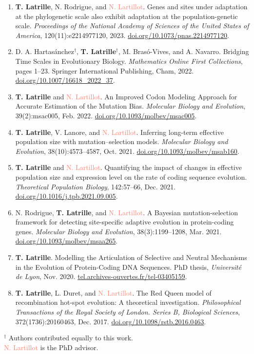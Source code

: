 \documentclass[11pt,a4paper]{moderncv}
\begin{document}
\begin{enumerate}
    \item \textbf{T. Latrille}, N. Rodrigue, and \textcolor{Salmon}{N. Lartillot}. Genes and sites under adaptation at the phylogenetic scale also exhibit adaptation at the population-genetic scale. \textit{Proceedings of the National Academy of Sciences of the United States of America}, 120(11):e2214977120, 2023. \href{https://doi.org/10.1073/pnas.2214977120}{doi.org/10.1073/pnas.2214977120}.
    \item D. A. Hartasánchez$^{\dag}$, \textbf{T. Latrille}$^{\dag}$, M. Brasó-Vives, and A. Navarro. Bridging Time Scales in Evolutionary Biology. \textit{Mathematics Online First Collections}, pages 1–23. Springer International Publishing, Cham, 2022. \href{https://doi.org/10.1007/16618_2022_37}{doi.org/10.1007/16618\_2022\_37}.
    \item \textbf{T. Latrille} and \textcolor{Salmon}{N. Lartillot}. An Improved Codon Modeling Approach for Accurate Estimation of the Mutation Bias. \textit{Molecular Biology and Evolution}, 39(2):msac005, Feb. 2022. \href{https://doi.org/10.1093/molbev/msac005}{doi.org/10.1093/molbev/msac005}.
    \item \textbf{T. Latrille}, V. Lanore, and \textcolor{Salmon}{N. Lartillot}. Inferring long-term effective population size with mutation–selection models. \textit{Molecular Biology and Evolution}, 38(10):4573–4587, Oct. 2021. \href{https://doi.org/10.1093/molbev/msab160}{doi.org/10.1093/molbev/msab160}.
    \item \textbf{T. Latrille} and \textcolor{Salmon}{N. Lartillot}. Quantifying the impact of changes in effective population size and expression level on the rate of coding sequence evolution. \textit{Theoretical Population Biology}, 142:57–66, Dec. 2021. \href{https://doi.org/10.1016/j.tpb.2021.09.005}{doi.org/10.1016/j.tpb.2021.09.005}.
    \item N. Rodrigue, \textbf{T. Latrille}, and \textcolor{Salmon}{N. Lartillot}. A Bayesian mutation-selection framework for detecting site-specific adaptive evolution in protein-coding genes. \textit{Molecular Biology and Evolution}, 38(3):1199–1208, Mar. 2021. \href{https://doi.org/10.1093/molbev/msaa265}{doi.org/10.1093/molbev/msaa265}.
    \item \textbf{T. Latrille}. Modelling the Articulation of Selective and Neutral Mechanisms in the Evolution of Protein-Coding DNA Sequences. PhD thesis, \textit{Université de Lyon}, Nov. 2020. \href{https://tel.archives-ouvertes.fr/tel-03405159}{tel.archives-ouvertes.fr/tel-03405159}.
    \item \textbf{T. Latrille}, L. Duret, and \textcolor{Salmon}{N. Lartillot}. The Red Queen model of recombination hot-spot evolution: A theoretical investigation. \textit{Philosophical Transactions of the Royal Society of London. Series B, Biological Sciences}, 372(1736):20160463, Dec. 2017. \href{https://doi.org/10.1098/rstb.2016.0463}{doi.org/10.1098/rstb.2016.0463}.
\end{enumerate}
\vspace{1em}
$^{\dag}$ Authors contributed equally to this work.\\
\textcolor{Salmon}{N. Lartillot} is the PhD advisor.
\end{document}
